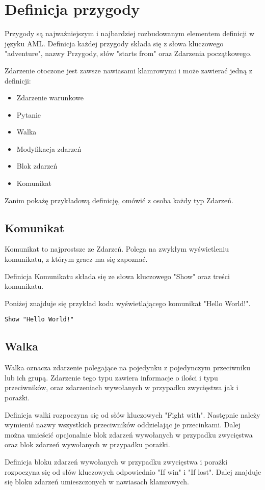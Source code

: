 \documentclass	{xmgr}
\begin{document}
\section{Definicja przygody}
Przygody są najważniejszym i najbardziej rozbudowanym elementem definicji w języku AML. 
Definicja każdej przygody składa się z słowa kluczowego "adventure", nazwy Przygody, słów "starts from" oraz Zdarzenia początkowego.

Zdarzenie otoczone jest zawsze nawiasami klamrowymi i może zawierać jedną z definicji:
\begin{itemize}
	\item Zdarzenie warunkowe
	\item Pytanie
	\item Walka
	\item Modyfikacja zdarzeń
	\item Blok zdarzeń
	\item Komunikat
\end{itemize}

Zanim pokażę przykładową definicję, omówić z osoba każdy typ Zdarzeń.
\subsection*{Komunikat}
Komunikat to najprostsze ze Zdarzeń. Polega na zwykłym wyświetleniu komunikatu, z którym gracz ma się zapoznać.

Definicja Komunikatu składa się ze słowa kluczowego "Show" oraz treści komunikatu.

Poniżej znajduje się przykład kodu wyświetlającego komunikat "Hello World!".
\begin{lstlisting}
Show "Hello World!"
\end{lstlisting}
\subsection*{Walka}
Walka oznacza zdarzenie polegające na pojedynku z pojedynczym przeciwniku lub ich grupą. Zdarzenie tego typu zawiera informacje o ilości i typu przeciwników, oraz zdarzeniach wywołanych w przypadku zwycięstwa jak i porażki.

Definicja walki rozpoczyna się od słów kluczowych "Fight with". Następnie należy wymienić nazwy wszystkich przeciwników oddzielając je przecinkami. Dalej można umieścić opcjonalnie blok zdarzeń wywołanych w przypadku zwycięstwa oraz blok zdarzeń wywołanych w przypadku porażki.

Definicja bloku zdarzeń wywołanych w przypadku zwycięstwa i porażki rozpoczyna się od słów kluczowych odpowiednio "If win" i "If lost". Dalej znajduje się bloku zdarzeń umieszczonych w nawiasach klamrowych.
\end{document}
